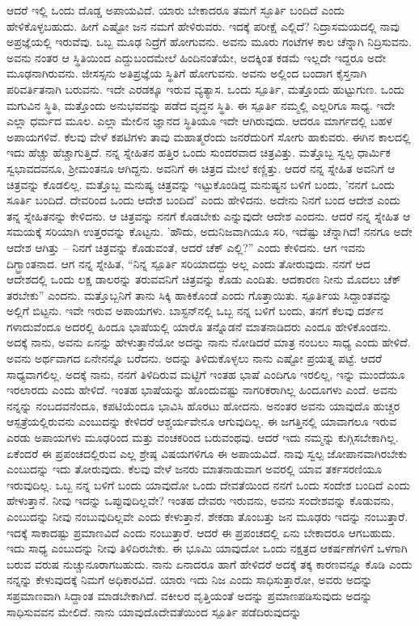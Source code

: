 ಆದರೆ ಇಲ್ಲಿ ಒಂದು ದೊಡ್ಡ ಅಪಾಯವಿದೆ. ಯಾರು ಬೇಕಾದರೂ ತಮಗೆ ಸ್ಫೂರ್ತಿ ಬಂದಿದೆ ಎಂದು ಹೇಳಿಕೊಳ್ಳಬಹುದು. ಹೀಗೆ ಎಷ್ಟೋ ಜನ ನಮಗೆ ಹೇಳಿರುವರು. ಇದಕ್ಕೆ ಪರೀಕ್ಷೆ ಎಲ್ಲಿದೆ? ನಿದ್ರಾಸಮಯದಲ್ಲಿ ನಾವು ಅಪ್ರಜ್ಞೆಯಲ್ಲಿ ಇರುವೆವು. ಒಬ್ಬ ಮೂಢ ನಿದ್ರೆಗೆ ಹೋಗುವನು. ಅವನು ಮೂರು ಗಂಟೆಗಳ ಕಾಲ ಚೆನ್ನಾಗಿ ನಿದ್ರಿಸುವನು. ಅವನು ನಂತರ ಆ ಸ್ಥಿತಿಯಿಂದ ಎದ್ದುಬಂದಮೇಲೆ ಹಿಂದಿನಂತೆಯೇ, ಅದಕ್ಕಿಂತ ಕಡಮೆ ಇಲ್ಲದೇ ಇದ್ದರೂ ಅದೇ ಮೂಢನಾಗಿರುವನು. ಜೀಸಸ್ಸನು ಅತಿಪ್ರಜ್ಞೆಯ ಸ್ಥಿತಿಗೆ ಹೋಗುವನು. ಅವನು ಅಲ್ಲಿಂದ ಬಂದಾಗ ಕೈಸ್ತನಾಗಿ ಪರಿವರ್ತಿತನಾಗಿ ಬರುವನು. ಇದೇ ಎರಡಕ್ಕೂ ಇರುವ ವ್ಯತ್ಯಾಸ. ಒಂದು ಸ್ಪೂರ್ತಿ, ಮತ್ತೊಂದು ಹುಟ್ಟುಗುಣ. ಒಂದು ಮಗುವಿನ ಸ್ಥಿತಿ, ಮತ್ತೊಂದು ಅನುಭವವನ್ನು ಪಡೆದ ವೃದ್ಧನ ಸ್ಥಿತಿ. ಈ ಸ್ಪೂರ್ತಿ ನಮ್ಮಲ್ಲಿ ಎಲ್ಲರಿಗೂ ಸಾಧ್ಯ. ಇದೇ ಎಲ್ಲಾ ಧರ್ಮದ ಮೂಲ. ಎಲ್ಲಾ ಮೇಲಿನ ಜ್ಞಾನದ ಸ್ಥಿತಿಯೂ ಇದೇ ಆಗಿರುವುದು. ಆದರೂ ಮಾರ್ಗದಲ್ಲಿ ಬಹಳ ಅಪಾಯಗಳಿವೆ. ಕೆಲವು ವೇಳೆ ಕಪಟಿಗಳು ತಾವು ಮಹಾತ್ಮರೆಂದು ಜನರೆದುರಿಗೆ ಸೋಗು ಹಾಕುವರು. ಈಗಿನ ಕಾಲದಲ್ಲಿ ಇದು ಹೆಚ್ಚು ಹೆಚ್ಚಾಗುತ್ತಿದೆ. ನನ್ನ ಸ್ನೇಹಿತನ ಹತ್ತಿರ ಒಂದು ಸುಂದರವಾದ ಚಿತ್ರವಿತ್ತು. ಮತ್ತೊಬ್ಬ ಸ್ವಲ್ಪ ಧಾರ್ಮಿಕ ಸ್ವಭಾವದವನೂ, ಶ‍್ರೀಮಂತನೂ ಆಗಿದ್ದನು. ಅವನಿಗೆ ಈ ಚಿತ್ರದ ಮೇಲೆ ಕಣ್ಣಿತ್ತು. ಆದರೆ ನನ್ನ ಸ್ನೇಹಿತ ಅವನಿಗೆ ಆ ಚಿತ್ರವನ್ನು ಕೊಡಲಿಲ್ಲ. ಮತ್ತೊಬ್ಬ ಮನುಷ್ಯ ಚಿತ್ರವನ್ನು ಇಟ್ಟುಕೊಂಡಿದ್ದ ಮನುಷ್ಯನ ಬಳಿಗೆ ಬಂದು, 'ನನಗೆ ಒಂದು ಸೂರ್ತಿ ಬಂದಿದೆ. ದೇವರಿಂದ ಒಂದು ಆದೇಶ ಬಂದಿದೆ' ಎಂದು ಹೇಳಿದನು. ಅದೇನು ನಿನಗೆ ಬಂದ ಆದೇಶ ಎಂದು ತನ್ನ ಸ್ನೇಹಿತನನ್ನು ಕೇಳಿದನು. ಆ ಚಿತ್ರವನ್ನು ನನಗೆ ಕೊಡಬೇಕು ಎನ್ನುವುದೇ ಆದೇಶ ಎಂದನು. ಆದರೆ ನನ್ನ ಸ್ನೇಹಿತ ಆ ಸಮಯಕ್ಕೆ ಸರಿಯಾಗಿ ಉತ್ತರವನ್ನು ಕೊಟ್ಟನು. 'ಹೌದು, ಅದು\break ನಿಜವಾಗಿಯೂ ಸರಿ, ಇದೆಷ್ಟು ಚೆನ್ನಾಗಿದೆ! ನನಗೂ ಅದೇ ಆದೇಶ ಆಗಿತ್ತು – ನಿನಗೆ ಚಿತ್ರವನ್ನು ಕೊಡುವಂತೆ, ಆದರೆ ಚೆಕ್ ಎಲ್ಲಿ?” ಎಂದು ಕೇಳಿದನು. ಆಗ ಇವನು ದಿಗ್ಭ್ರಾಂತನಾದ. ಆಗ ನನ್ನ ಸ್ನೇಹಿತ, “ನಿನ್ನ ಸ್ಪೂರ್ತಿ ಸರಿಯಾದದ್ದು ಅಲ್ಲ ಎಂದು ತೋರುವುದು. ನನಗೆ ಆದ ಆದೇಶದಲ್ಲಿ ಒಂದು ಲಕ್ಷ ಡಾಲರನ್ನು ತರುವವನಿಗೆ ಚಿತ್ರವನ್ನು ಕೊಡು ಎಂದಿತು. ಆದಕಾರಣ ನೀನು ಮೊದಲು ಚೆಕ್ ತರಬೇಕು'' ಎಂದನು. ಮತ್ತೊಬ್ಬನಿಗೆ ತಾನು ಸಿಕ್ಕಿ ಹಾಕಿಕೊಂಡೆ ಎಂದು ಗೊತ್ತಾಯಿತು. ಸ್ಪೂರ್ತಿಯ ಸಿದ್ದಾಂತವನ್ನು ಅಲ್ಲಿಗೆ ಬಿಟ್ಟನು. ಇವೇ ಇರುವ ಅಪಾಯಗಳು. ಬಾಸ್ಟನ್‌ನಲ್ಲಿ ಒಬ್ಬ ನನ್ನ ಬಳಿಗೆ ಬಂದು, ತನಗೆ ಕೆಲವು ದರ್ಶನ ಗಳಾದುವೆಂದೂ ಅದರಲ್ಲಿ ಹಿಂದೂ ಭಾಷೆಯಲ್ಲಿ ಯಾರೊ ತನ್ನೊಡನೆ ಮಾತನಾಡಿದರು ಎಂದೂ ಹೇಳಿಕೊಂಡನು. ಅದಕ್ಕೆ ನಾನು, ಅವನು ಏನನ್ನು ಹೇಳುತ್ತಾನೆಯೋ ಅದನ್ನು ನಾನು ನೋಡಿದರೆ ಮಾತ್ರ ನಂಬಲು ಸಾಧ್ಯ ಎಂದು ಹೇಳಿದೆ. ಅವನು ಅರ್ಥವಾಗದ ಏನೇನನ್ನೊ ಬರೆದನು. ಅದನ್ನು ತಿಳಿದುಕೊಳ್ಳಲು ನಾನು ಎಷ್ಟೋ ಪ್ರಯತ್ನ ಪಟ್ಟೆ. ಆದರೆ ಸಾಧ್ಯವಾಗಲಿಲ್ಲ. ಅದಕ್ಕೆ ನಾನು, ನನಗೆ ತಿಳಿದಿರುವ ಮಟ್ಟಿಗೆ ಇಂತಹ ಭಾಷೆ ಎಂದಿಗೂ ಇರಲಿಲ್ಲ, ಇನ್ನು ಮುಂದೆಯೂ ಇರಲಾರದು ಎಂದು ಹೇಳಿದೆ. ಇಂತಹ ಭಾಷೆಯನ್ನು ಹೊಂದುವಷ್ಟು ನಾಗರಿಕರಾಗಿಲ್ಲ ಹಿಂದೂಗಳು ಎಂದೆ. ಅವನು ನನ್ನನ್ನು ನಂಬದವನೆಂದೂ, ಕಪಟಿಯೆಂದೂ ಭಾವಿಸಿ ಹೊರಟು ಹೋದನು. ಅನಂತರ ಅವನು ಯಾವುದೊ ಹುಚ್ಚರ ಆಸ್ಪತ್ರೆಯಲ್ಲಿರುವನು ಎಂಬುದನ್ನು ಕೇಳಿದರೆ ಆಶ್ಚರ್ಯವೇನೂ ಆಗುವುದಿಲ್ಲ. ಈ ಜಗತ್ತಿನಲ್ಲಿ ಯಾವಾಗಲೂ ಇರುವ ಎರಡು ಅಪಾಯಗಳು ಮೂಢರಿಂದ ಮತ್ತು ವಂಚಕರಿಂದ ಬರುವಂಥವು. ಆದರೆ ಇದು ನಮ್ಮನ್ನು ಕುಗ್ಗಿಸಬೇಕಾಗಿಲ್ಲ. ಏಕೆಂದರೆ ಈ ಪ್ರಪಂಚದಲ್ಲಿರುವ ಎಲ್ಲ ಶ್ರೇಷ್ಠ ವಿಷಯಗಳಿಗೂ ಈ ಅಪಾಯವಿದೆ. ನಾವು ಸ್ವಲ್ಪ ಜೋಪಾನವಾಗಿರಬೇಕು ಎಂಬುದನ್ನು ಇದು ತೋರುವುದು. ಕೆಲವು ವೇಳೆ ಜನರು ಮಾತನಾಡುವಾಗ ಅವರಲ್ಲಿ ಯಾವ ತರ್ಕಸರಣಿಯೂ ಇರುವುದಿಲ್ಲ. ಒಬ್ಬ ನನ್ನ ಬಳಿಗೆ ಬಂದು ಯಾವುದೋ ಒಂದು ದೇವತೆಯಿಂದ ನನಗೆ ಒಂದು ಸಂದೇಶ ಬಂದಿದೆ ಎಂದು ಹೇಳುತ್ತಾನೆ. ನೀವು ಇದನ್ನು ಒಪ್ಪುವುದಿಲ್ಲವೇ? ಇಂತಹ ದೇವರು ಇರುವನು, ಅವನು ಸಂದೇಶವನ್ನು ಕೊಡುವನು, ಎಂಬುದನ್ನು ನೀವು ನಂಬುವುದಿಲ್ಲವೇ ಎಂದು ಕೇಳುತ್ತಾನೆ. ಶೇಕಡಾ ತೊಂಬತ್ತು ಜನ ಮೂಢರು ಇದನ್ನು ನಂಬುತ್ತಾರೆ. ಇದಕ್ಕೆ ಸಾಕಾದಷ್ಟು ಪ್ರಮಾಣವಿದೆ ಎಂದು ನಂಬುತ್ತಾರೆ. ಆದರೆ ಈ ಪ್ರಪಂಚದಲ್ಲಿ ಏನು ಬೇಕಾದರೂ ಆಗಬಹುದು. ಇದು ಸಾಧ್ಯ ಎಂಬುದನ್ನು ನೀವು ತಿಳಿದಿರಬೇಕು. ಈ ಭೂಮಿ ಯಾವುದೋ ಒಂದು ನಕ್ಷತ್ರದ ಆಕರ್ಷಣೆಗಳಿಗೆ ಒಳಗಾಗಿ ಬರುವ ವರುಷ ನುಚ್ಚುನೂರಾಗಬಹುದು. ನಾನು ಏನಾದರೂ ಹಾಗೆ ಹೇಳಿದರೆ ಅದಕ್ಕೆ ತಕ್ಕ ಕಾರಣವನ್ನೂ ಕೊಡಿ ಎಂದು ನನ್ನನ್ನು ಕೇಳುವುದಕ್ಕೆ ನಿಮಗೆ ಅಧಿಕಾರವಿದೆ. ಯಾರು ಇದು ನಿಜ ಎಂದು ಸಾಧಿಸುತ್ತಾರೋ, ಅವರು ಅದನ್ನು ಸಪ್ರಮಾಣವಾಗಿ ಸಿದ್ದಾಂತ ಮಾಡಬೇಕಾಗಿದೆ. ವಕೀಲರ ವೃತ್ತಿಯಂತೆ ಅದನ್ನು ಪ್ರಮಾಣಪಡಿಸುವುದು ಅದನ್ನು ಸಾಧಿಸುವವನ ಮೇಲಿದೆ. ನಾನು ಯಾವುದೊ\break ದೇವತೆಯಿಂದ ಸ್ಪೂರ್ತಿ ಪಡೆದಿರುವುದನ್ನು 